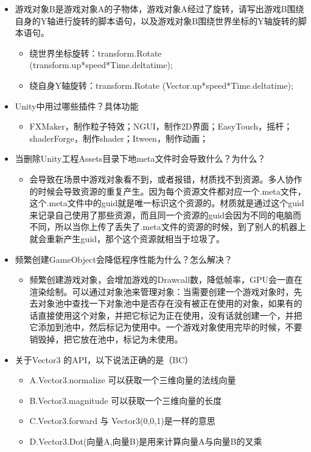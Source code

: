 \documentclass[9pt, b5paper]{article}
\begin{document}
\begin{itemize}
\item 游戏对象B是游戏对象A的子物体，游戏对象A经过了旋转，请写出游戏B围绕自身的Y轴进行旋转的脚本语句，以及游戏对象B围绕世界坐标的Y轴旋转的脚本语句。
\begin{itemize}
\item 绕世界坐标旋转：transform.Rotate (transform.up*speed*Time.deltatime);
\item 绕自身Y轴旋转：transform.Rotate (Vector.up*speed*Time.deltatime);
\end{itemize}
\item Unity中用过哪些插件？具体功能
\begin{itemize}
\item FXMaker，制作粒子特效；NGUI，制作2D界面；EasyTouch，摇杆；shaderForge，制作shader；Itween，制作动画；
\end{itemize}
\item 当删除Unity工程Assets目录下地meta文件时会导致什么？为什么？
\begin{itemize}
\item 会导致在场景中游戏对象看不到，或者报错，材质找不到资源。多人协作的时候会导致资源的重复产生。因为每个资源文件都对应一个.meta文件，这个.meta文件中的guid就是唯一标识这个资源的。材质就是通过这个guid来记录自己使用了那些资源，而且同一个资源的guid会因为不同的电脑而不同，所以当你上传了丢失了.meta文件的资源的时候，到了别人的机器上就会重新产生guid，那个这个资源就相当于垃圾了。
\end{itemize}
\item 频繁创建GameObject会降低程序性能为什么？怎么解决？
\begin{itemize}
\item 频繁创建游戏对象，会增加游戏的Drawcall数，降低帧率，GPU会一直在渲染绘制。可以通过对象池来管理对象：当需要创建一个游戏对象时，先去对象池中查找一下对象池中是否存在没有被正在使用的对象，如果有的话直接使用这个对象，并把它标记为正在使用，没有话就创建一个，并把它添加到池中，然后标记为使用中。一个游戏对象使用完毕的时候，不要销毁掉，把它放在池中，标记为未使用。
\end{itemize}
\item 关于Vector3 的API，以下说法正确的是（BC）
\begin{itemize}
\item A.Vector3.normalize 可以获取一个三维向量的法线向量
\item B.Vector3.magnitude 可以获取一个三维向量的长度
\item C.Vector3.forward 与 Vector3(0,0,1)是一样的意思
\item D.Vector3.Dot(向量A,向量B)是用来计算向量A与向量B的叉乘

\end{itemize}
\end{itemize}
\end{document}
